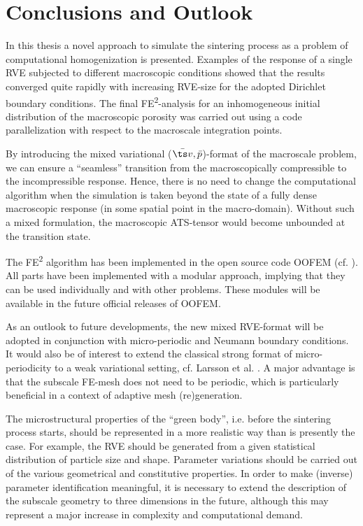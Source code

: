 \documentclass[ExampleMasters.tex]{subfiles}
\begin{document}
\chapter{Conclusions and Outlook}

In this thesis a novel approach to simulate the sintering process as a problem of computational homogenization is presented.
Examples of the response of a single RVE subjected to different macroscopic conditions showed that the results converged quite rapidly with increasing RVE-size for the adopted Dirichlet boundary conditions. 
The final FE\textsuperscript{2}-analysis for an inhomogeneous initial distribution of the macroscopic porosity was carried out using a code parallelization with respect to the macroscale integration points. 

By introducing the mixed variational ($\bar{\ts v},\bar{p}$)-format of the macroscale problem, we can ensure a ``seamless'' transition from the macroscopically compressible to the incompressible response.
Hence, there is no need to change the computational algorithm when the simulation is taken beyond the state of a fully dense macroscopic response (in some spatial point in the macro-domain).
Without such a mixed formulation, the macroscopic ATS-tensor would become unbounded at the transition state.

The FE\textsuperscript{2} algorithm has been implemented in the open source code OOFEM (cf. \cite{Patzak2000:OOFEM}).
All parts have been implemented with a modular approach, implying that they can be used individually and with other problems.
These modules will be available in the future official releases of OOFEM.

As an outlook to future developments, the new mixed RVE-format will be adopted in conjunction with micro-periodic and Neumann boundary conditions.
It would also be of interest to extend the classical strong format of micro-periodicity to a weak variational setting, cf. Larsson et al. \cite{Larsson_etal2011}.
A major advantage is that the subscale FE-mesh does not need to be periodic, which is particularly beneficial in a context of adaptive mesh (re)generation. 

The microstructural properties of the ``green body'', i.e. before the sintering process starts, should be represented in a more realistic way than is presently the case.
For example, the RVE should be generated from a given statistical distribution of particle size and shape.
Parameter variations should be carried out of the various geometrical and constitutive properties.
In order to make (inverse) parameter identification meaningful, it is necessary to extend the description of the subscale geometry to three dimensions in the future, although this may represent a major increase in complexity and computational demand. 
\end{document}
